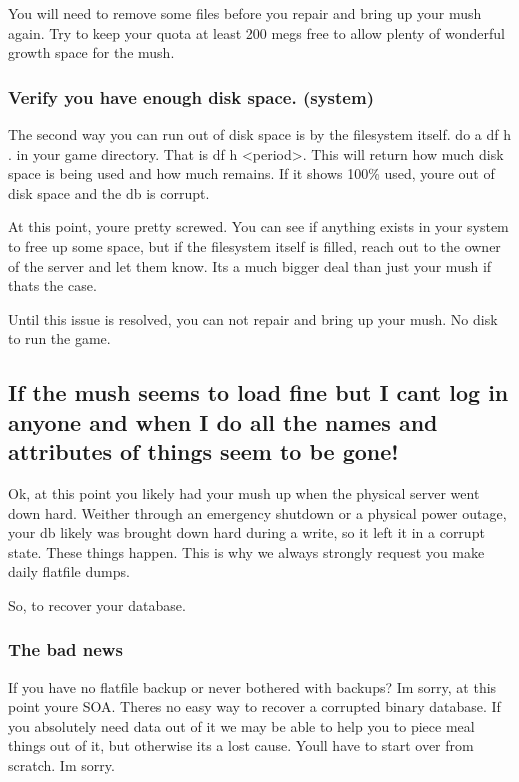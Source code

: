 \documentclass[letterpaper,10pt,english]{sphinxmanual}
\begin{document}
\sphinxAtStartPar
You will need to remove some files before you repair and bring up your
mush again.  Try to keep your quota at least 200 megs free to allow
plenty of wonderful growth space for the mush.


\subsubsection{Verify you have enough disk space.  (system)}
\label{\detokenize{troubleshooting:verify-you-have-enough-disk-space-system}}
\sphinxAtStartPar
The second way you can run out of disk space is by the filesystem itself.
do a df \sphinxhyphen{}h . in your \textquotesingle{}game\textquotesingle{} directory\textquotesingle{}.  That is df \sphinxhyphen{}h \textless{}period\textgreater{}.
This will return how much disk space is being used and how much remains.
If it shows 100\% used, you\textquotesingle{}re out of disk space and the db is corrupt.

\sphinxAtStartPar
At this point, you\textquotesingle{}re pretty screwed.  You can see if anything exists
in your system to free up some space, but if the filesystem itself
is filled, reach out to the owner of the server and let them know.
It\textquotesingle{}s a much bigger deal than just your mush if that\textquotesingle{}s the case.

\sphinxAtStartPar
Until this issue is resolved, you can not repair and bring up your mush.
No disk to run the game.


\subsection{If the mush seems to load fine but I can\textquotesingle{}t log in anyone and when I do all the names and attributes of things seem to be gone!}
\label{\detokenize{troubleshooting:if-the-mush-seems-to-load-fine-but-i-can-t-log-in-anyone-and-when-i-do-all-the-names-and-attributes-of-things-seem-to-be-gone}}
\sphinxAtStartPar
Ok, at this point you likely had your mush up when the physical server
went down hard.  Weither through an emergency shutdown or a physical
power outage, your db likely was brought down hard during a write,
so it left it in a corrupt state.  These things happen.  This is
why we always strongly request you make daily flatfile dumps.

\sphinxAtStartPar
So, to recover your database.


\subsubsection{The bad news}
\label{\detokenize{troubleshooting:the-bad-news}}
\sphinxAtStartPar
If you have no flatfile backup or never bothered with backups?
I\textquotesingle{}m sorry, at this point you\textquotesingle{}re SOA.  There\textquotesingle{}s no easy way to
recover a corrupted binary database.  If you absolutely need
data out of it we may be able to help you to piece meal things
out of it, but otherwise it\textquotesingle{}s a lost cause.  You\textquotesingle{}ll have to start
over from scratch.  I\textquotesingle{}m sorry.
\end{document}
